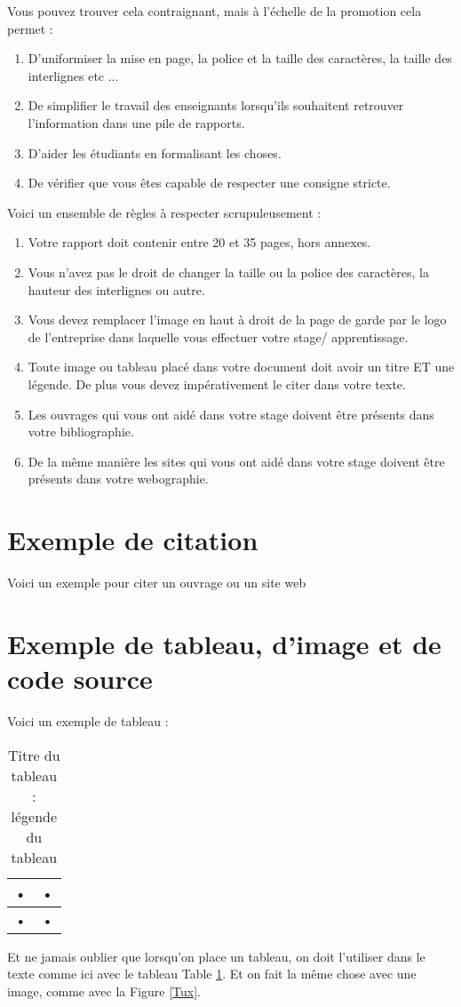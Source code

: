 \documentclass[a4paper, 12pt, twoside]{report}
\begin{document}
Vous pouvez trouver cela contraignant, mais à l'échelle de la promotion cela permet :
\begin{enumerate}
	\item D'uniformiser la mise en page, la police et la taille des caractères, la taille des interlignes etc ...
	\item De simplifier le travail des enseignants lorsqu'ils souhaitent retrouver l'information dans une pile de rapports.
	\item D'aider les étudiants en formalisant les choses.
	\item De vérifier que vous êtes capable de respecter une consigne stricte. 
\end{enumerate}
$\ $\\
Voici un ensemble de règles à respecter scrupuleusement :
\begin{enumerate}
\item Votre rapport doit contenir entre 20 et 35 pages, hors annexes.
\item Vous n'avez pas le droit de changer la taille ou la police des caractères, la hauteur des interlignes ou autre.
\item Vous devez remplacer l'image en haut à droit de la page de garde par le logo de l'entreprise dans laquelle vous effectuer votre stage/ apprentissage.
\item Toute image ou tableau placé dans votre document doit avoir un titre ET une légende. De plus vous devez impérativement le citer dans votre texte. 
\item Les ouvrages qui vous ont aidé dans votre stage doivent être présents dans votre bibliographie.
\item De la même manière les sites qui vous ont aidé dans votre stage doivent être présents dans votre webographie.
\end{enumerate}

\section{Exemple de citation}
Voici un exemple pour citer un ouvrage ou un site web \cite{cat}
\section{Exemple de tableau, d'image et de code source}
Voici un exemple de tableau :
\begin{table}[h]
\begin{center}
\begin{tabular}{|c|c|}
\hline 
• & • \\ 
\hline 
• & • \\ 
\hline 
\end{tabular} 
\end{center}
\label{referencedutableau}

\caption{Titre du tableau : légende du tableau}
\end{table}
Et ne jamais oublier que lorsqu'on place un tableau, on doit l'utiliser dans le texte comme ici avec le tableau Table \ref{referencedutableau}. Et on fait la même chose avec une image, comme avec la Figure \ref{Tux}.
\end{document}

